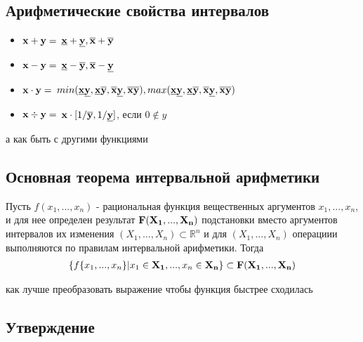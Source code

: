 \documentclass{article}
\begin{document}
    \subsection{Арифметические свойства интервалов}
    \begin{itemize}

        \item {$\bold{x} + \bold{y} =$ {${\bold{\underline{x}} + \bold{\underline{y}},  \bold{\overline{x}} + \bold{\overline{y}}}$}}

        \item {$\bold{x} - \bold{y} =$ {${\bold{\underline{x}} - \bold{\overline{y}},  \bold{\overline{x}} - \bold{\underline{y}}}$}}

        \item {$\bold{x} \cdot \bold{y} =$ {${min(\bold{\underline{x} \underline{y}}, \bold{\underline{x} \overline{y}}, \bold{\overline{x} \underline{y}}, \bold{\overline{x} \overline{y}}) , max(\bold{\underline{x} \underline{y}}, \bold{\underline{x} \overline{y}}, \bold{\overline{x} \underline{y}}, \bold{\overline{x} \overline{y}}) }$}}

        \item {$\bold{x} \div \bold{y} =$ $\bold{x} \cdot[1/\bold{\overline{y}}, 1/\bold{\underline{y}}]$, если $0 \not\in y$}

    \end{itemize}

    а как быть с другими функциями

    \subsection{Основная теорема интервальной арифметики}
    Пусть $f(x_1, ..., x_n)$ - рациональная функция вещественных аргументов $x_1, ..., x_n$, и для нее определен результат $\bold{F(X_1, ..., X_n)}$ подстановки вместо аргументов интервалов их изменения $(X_1, ..., X_n) \subset \mathbb{R}^n$ и для $(X_1, ..., X_n)$ операциии выполняются по правилам интервальной арифметики. Тогда
    \begin{gather*}
        \{f\{x_1,...,x_n\} | x_1 \in \bold{X_1},...,x_n \in \bold{X_n}\} \subset \bold{F(\bold{X_1},...,\bold{X_n}})
    \end{gather*}

    как лучше преобразовать выражение чтобы функция быстрее сходилась

    \subsection{Утверждение}
\end{document}
